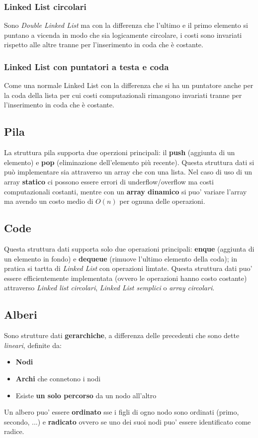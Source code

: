 \documentclass{article}
\begin{document}
\subsubsection{Linked List circolari}
Sono \textit{Double Linked List} ma con la differenza che l'ultimo e il primo elemento si puntano a vicenda in modo che sia logicamente circolare, 
i costi sono invariati rispetto alle altre tranne per l'inserimento in coda che è costante.

\subsubsection{Linked List con puntatori a testa e coda}
Come una normale Linked List con la differenza che si ha un puntatore anche per la coda della lista per cui 
costi computazionali rimangono invariati tranne per l'inserimento in coda che è costante.

\subsection{Pila}
La struttura pila supporta due operzioni principali: il \textbf{push} (aggiunta di un elemento) e \textbf{pop} (eliminazione dell'elemento più recente). 
Questa struttura dati si può implementare sia attraverso un array che con una lista. Nel caso di uso di un array \textbf{statico} ci possono essere errori di underflow/overflow ma costi computazionali costanti, mentre con un \textbf{array dinamico} si puo' variare l'array ma avendo un costo medio di $O(n)$ per ognuna delle operazioni.

\subsection{Code}
Questa struttura dati supporta solo due operazioni principali: \textbf{enque} (aggiunta di un elemento in fondo) e \textbf{dequeue} (rimuove l'ultimo elemento della coda); in pratica si tartta di \textit{Linked List} con operazioni limtate.
Questa struttura dati puo' essere efficientemente implementata (ovvero le operazioni hanno costo costante) attraverso \textit{Linked list circolari}, \textit{Linked List semplici} o \textit{array circolari}.

\subsection{Alberi}
Sono strutture dati \textbf{gerarchiche}, a differenza delle precedenti che sono dette \textit{lineari}, definite da:
\begin{itemize}
    \item \textbf{Nodi}
    \item \textbf{Archi} che connetono i nodi
    \item Esiste \textbf{un solo percorso} da un nodo all'altro
\end{itemize}
Un albero puo' essere \textbf{ordinato} sse i figli di ogno nodo sono ordinati (primo, secondo, ...) e \textbf{radicato} ovvero se uno dei suoi nodi puo' essere identificato come radice.
\end{document}
